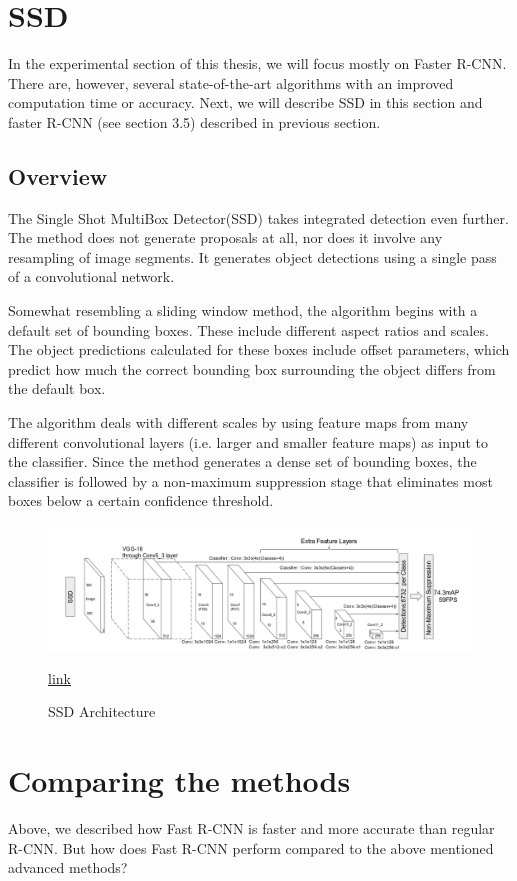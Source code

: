 \section{ SSD}
In the experimental section of this thesis, we will focus mostly on Faster R-CNN. There are, however, several state-of-the-art algorithms with an improved computation time or accuracy. Next, we will describe SSD in this section and faster R-CNN (see section 3.5) described in previous section.


\subsection{Overview}
The Single Shot MultiBox Detector(SSD) takes integrated detection even further. The method does not generate proposals at all, nor does it involve any resampling of image segments. It generates object detections using a single pass of a convolutional network.

Somewhat resembling a sliding window method, the algorithm begins with a default set of bounding boxes. These include different aspect ratios and scales. The object predictions calculated for these boxes include offset parameters, which predict how much the correct bounding box surrounding the object differs from the default box.

The algorithm deals with different scales by using feature maps from many different convolutional layers (i.e. larger and smaller feature maps) as input to the classifier. Since the method generates a dense set of bounding boxes, the classifier is followed by a non-maximum suppression stage that eliminates most boxes below a certain confidence threshold.


\begin{figure}
	\centering
	\includegraphics[width=1.0\linewidth]{img17}
	\caption{SSD Architecture} \href{https://towardsdatascience.com/learning-note-single-shot-multibox-detector-with-pytorch-part-1-38185e84bd79}{link}
	\label{fig:img17}
\end{figure}


\section{Comparing the methods}
Above, we described how Fast R-CNN is faster and more accurate than regular R-CNN. But how does Fast R-CNN perform compared to the above mentioned advanced methods?

